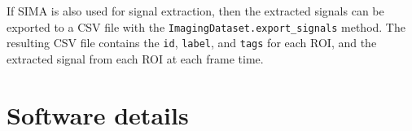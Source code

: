 If SIMA is also used for signal extraction, then the extracted signals can be
exported to a CSV file with the \verb|ImagingDataset.export_signals| method.
The resulting CSV file contains the \verb|id|, \verb|label|, and \verb|tags| for each
ROI, and the extracted signal from each ROI at each frame time.


\section{Software details}
\label{sec:sima:details}





